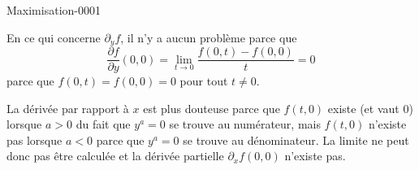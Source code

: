 
\begin{corrige}{Maximisation-0001}

	En ce qui concerne $\partial_yf$, il n'y a aucun problème parce que
	\begin{equation}
		\frac{ \partial f }{ \partial y }(0,0)=\lim_{t\to 0}\frac{ f(0,t)-f(0,0) }{ t }=0
	\end{equation}
	parce que $f(0,t)=f(0,0)=0$ pour tout $t\neq 0$.

	La dérivée par rapport à $x$ est plus douteuse parce que $f(t,0)$ existe (et vaut $0$) lorsque $a>0$ du fait que $y^a=0$ se trouve au numérateur, mais $f(t,0)$ n'existe pas lorsque $a<0$ parce que $y^a=0$ se trouve au dénominateur. La limite ne peut donc pas être calculée et la dérivée partielle $\partial_xf(0,0)$ n'existe pas.

\end{corrige}
